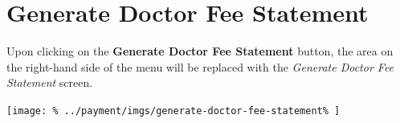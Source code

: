\documentclass[../main/main]{subfiles}
\begin{document}
\newpage
\section{Generate Doctor Fee Statement}
\label{sec:generate-doctor-fee-statement}

Upon clicking on the \textbf{Generate Doctor Fee Statement} button,
the area on the right-hand side of the menu will be replaced with the
\emph{Generate Doctor Fee Statement} screen.

\texttt{[image: \%
  ../payment/imgs/generate-doctor-fee-statement\%
]}
\end{document}
